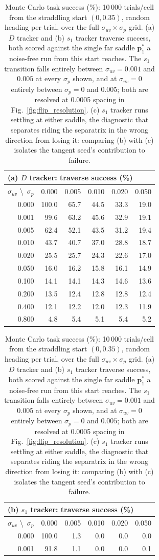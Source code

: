\documentclass[lettersize,journal]{IEEEtran}
\begin{document}
\begin{table}[!t]
\centering
\caption{Monte Carlo task success (\%): 10\,000 trials/cell from the
straddling start $(0, 0.35)$, random heading per trial, over the full
$\sigma_{uv} \times \sigma_p$ grid. (a) $D$ tracker and (b) $s_1$
tracker traverse success, both scored against the single far saddle
$\mathbf{p}^*_1$ a noise-free run from this start reaches. The $s_1$
transition falls entirely between $\sigma_{uv} = 0.001$ and $0.005$ at
every $\sigma_p$ shown, and at $\sigma_{uv} = 0$ entirely between
$\sigma_p = 0$ and $0.005$; both are resolved at 0.0005 spacing in
Fig.~\ref{fig:flip_resolution}. (c) $s_1$ tracker runs settling at
either saddle, the diagnostic that separates riding the separatrix in
the wrong direction from losing it: comparing (b) with (c) isolates the
tangent seed's contribution to failure.}
\label{tab:mc_success}
\footnotesize
\setlength{\tabcolsep}{4pt}
\begin{tabular}{r|rrrrr}
\multicolumn{6}{l}{(a) $D$ tracker: traverse success (\%)} \\
\hline
$\sigma_{uv}$ \textbackslash\ $\sigma_p$ & 0.000 & 0.005 & 0.010 & 0.020 & 0.050 \\
\hline
0.000 & 100.0 & 65.7 & 44.5 & 33.3 & 19.0 \\
0.001 &  99.6 & 63.2 & 45.6 & 32.9 & 19.1 \\
0.005 &  62.4 & 52.1 & 43.5 & 31.2 & 19.4 \\
0.010 &  43.7 & 40.7 & 37.0 & 28.8 & 18.7 \\
0.020 &  25.5 & 25.7 & 24.3 & 22.6 & 17.0 \\
0.050 &  16.0 & 16.2 & 15.8 & 16.1 & 14.9 \\
0.100 &  14.1 & 14.1 & 14.3 & 14.6 & 13.6 \\
0.200 &  13.5 & 12.4 & 12.8 & 12.8 & 12.4 \\
0.400 &  12.1 & 12.2 & 12.0 & 12.3 & 11.9 \\
0.800 &   4.8 &  5.4 &  5.1 &  5.4 &  5.2 \\
\hline
\end{tabular}
\hspace{1.5em}
\begin{tabular}{r|rrrrr}
\multicolumn{6}{l}{(b) $s_1$ tracker: traverse success (\%)} \\
\hline
$\sigma_{uv}$ \textbackslash\ $\sigma_p$ & 0.000 & 0.005 & 0.010 & 0.020 & 0.050 \\
\hline
0.000 & 100.0 &  1.3 &  0.0 &  0.0 &  0.0 \\
0.001 &  91.8 &  1.1 &  0.0 &  0.0 &  0.1 \\

\end{tabular}
\end{table}
\end{document}

